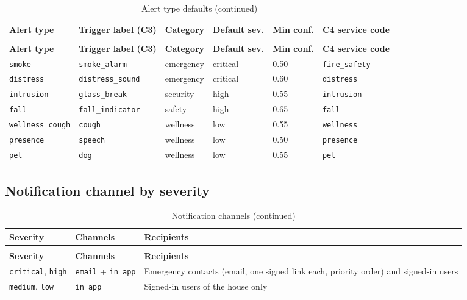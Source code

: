 \begin{longtable}{L{2.6cm}L{2.6cm}L{2.0cm}L{2.0cm}L{1.6cm}L{2.6cm}}
\caption{Alert type defaults}\label{tab:c2-defaults}\\
\toprule
\textbf{Alert type} & \textbf{Trigger label (C3)} & \textbf{Category} & \textbf{Default sev.} & \textbf{Min conf.} & \textbf{C4 service code} \\
\midrule
\endfirsthead
\caption[]{Alert type defaults (continued)}\\
\toprule
\textbf{Alert type} & \textbf{Trigger label (C3)} & \textbf{Category} & \textbf{Default sev.} & \textbf{Min conf.} & \textbf{C4 service code} \\
\midrule
\endhead
\texttt{smoke} & \texttt{smoke\_alarm} & emergency & critical & 0.50 & \texttt{fire\_safety} \\
\texttt{distress} & \texttt{distress\_sound} & emergency & critical & 0.60 & \texttt{distress} \\
\texttt{intrusion} & \texttt{glass\_break} & security & high & 0.55 & \texttt{intrusion} \\
\texttt{fall} & \texttt{fall\_indicator} & safety & high & 0.65 & \texttt{fall} \\
\texttt{wellness\_cough} & \texttt{cough} & wellness & low & 0.55 & \texttt{wellness} \\
\texttt{presence} & \texttt{speech} & wellness & low & 0.50 & \texttt{presence} \\
\texttt{pet} & \texttt{dog} & wellness & low & 0.55 & \texttt{pet} \\
\bottomrule
\end{longtable}

\subsection{Notification channel by severity}
\begin{longtable}{L{3.0cm}L{5.0cm}L{6.0cm}}
\caption{Notification channels}\\
\toprule
\textbf{Severity} & \textbf{Channels} & \textbf{Recipients} \\
\midrule
\endfirsthead
\caption[]{Notification channels (continued)}\\
\toprule
\textbf{Severity} & \textbf{Channels} & \textbf{Recipients} \\
\midrule
\endhead
\texttt{critical}, \texttt{high} & \texttt{email} + \texttt{in\_app} & Emergency contacts (email, one signed link each, priority order) and signed-in users \\
\texttt{medium}, \texttt{low} & \texttt{in\_app} & Signed-in users of the house only \\
\bottomrule
\end{longtable}

